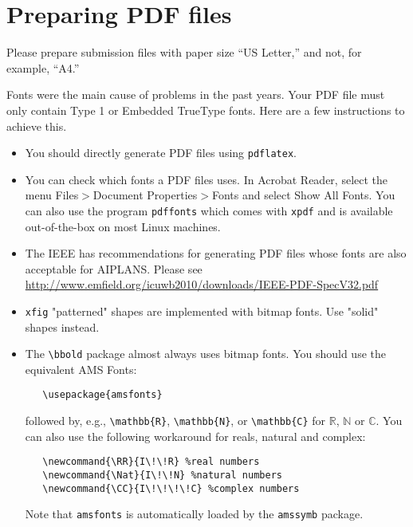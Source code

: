 \documentclass{article}
\begin{document}
  \section{Preparing PDF files}

  Please prepare submission files with paper size ``US Letter,'' and not, for
  example, ``A4.''

  Fonts were the main cause of problems in the past years. Your PDF file must only
  contain Type 1 or Embedded TrueType fonts. Here are a few instructions to
  achieve this.

  \begin{itemize}

    \item You should directly generate PDF files using \verb+pdflatex+.

    \item You can check which fonts a PDF files uses.  In Acrobat Reader, select the
    menu Files$>$Document Properties$>$Fonts and select Show All Fonts. You can
    also use the program \verb+pdffonts+ which comes with \verb+xpdf+ and is
    available out-of-the-box on most Linux machines.

    \item The IEEE has recommendations for generating PDF files whose fonts are also
    acceptable for AIPLANS. Please see
    \url{http://www.emfield.org/icuwb2010/downloads/IEEE-PDF-SpecV32.pdf}

    \item \verb+xfig+ "patterned" shapes are implemented with bitmap fonts.  Use
    "solid" shapes instead.

    \item The \verb+\bbold+ package almost always uses bitmap fonts.  You should use
    the equivalent AMS Fonts:
    \begin{verbatim}
   \usepackage{amsfonts}
    \end{verbatim}
    followed by, e.g., \verb+\mathbb{R}+, \verb+\mathbb{N}+, or \verb+\mathbb{C}+
    for $\mathbb{R}$, $\mathbb{N}$ or $\mathbb{C}$.  You can also use the following
    workaround for reals, natural and complex:
    \begin{verbatim}
   \newcommand{\RR}{I\!\!R} %real numbers
   \newcommand{\Nat}{I\!\!N} %natural numbers
   \newcommand{\CC}{I\!\!\!\!C} %complex numbers
    \end{verbatim}
    Note that \verb+amsfonts+ is automatically loaded by the \verb+amssymb+ package.

  \end{itemize}
\end{document}
